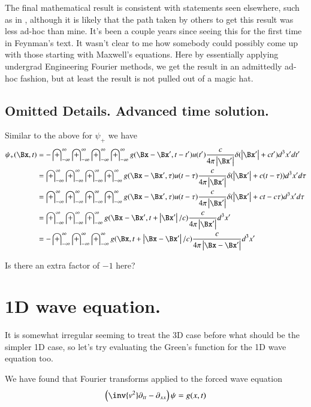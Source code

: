 \documentclass{article}
\newcommand{\IIinf}[0]{ \int_{-\infty}^\infty }
\begin{document}
The final mathematical result is consistent with statements seen elsewhere, such as in \cite{feynman1963flp}, although it is
likely that the path taken by others to get this result was less ad-hoc than mine.
It's been a couple years since seeing this for the
first time in Feynman's text.
It wasn't clear to me how somebody could possibly come up with those starting with Maxwell's equations.  
Here by essentially applying undergrad Engineering Fourier methods, we get the result in an admittedly ad-hoc fashion, but at least the result is not 
pulled out of a magic hat.

\subsection{ Omitted Details.  Advanced time solution. }

Similar to the above for $\psi_{+}$ we have
\begin{align*}
{\psi}_{+}(\Bx, t) 
&= -\IIinf \IIinf \IIinf \IIinf g(\Bx - \Bx', t - t') u(t') \frac{c }{4\pi \Abs{\Bx'}} \delta(\Abs{\Bx'} + c t') d^3 x' dt' \\
&= \IIinf \IIinf \IIinf \IIinf g(\Bx - \Bx', \tau) u(t -\tau) \frac{c }{4\pi \Abs{\Bx'}} \delta(\Abs{\Bx'} + c (t -\tau)) d^3 x' d\tau \\
&= \IIinf \IIinf \IIinf \IIinf g(\Bx - \Bx', \tau) u(t -\tau) \frac{c }{4\pi \Abs{\Bx'}} \delta(\Abs{\Bx'} + c t -c\tau) d^3 x' d\tau \\
&= \IIinf \IIinf \IIinf g(\Bx - \Bx', t + \Abs{\Bx'}/c) \frac{c }{4\pi \Abs{\Bx'}} d^3 x' \\
&= -\IIinf \IIinf \IIinf g(\Bx, t + \Abs{\Bx -\Bx'}/c) \frac{c }{4\pi \Abs{\Bx -\Bx'}} d^3 x' \\
\end{align*}

Is there an extra factor of $-1$ here?

\section{ 1D wave equation. }

It is somewhat irregular seeming to treat the 3D case before what should be the simpler 1D case, so let's 
try evaluating the Green's function for the 1D wave equation too.

We have found that Fourier transforms applied to the forced wave equation 
\begin{align}
\left( \inv{v^2} \partial_{tt} -\partial_{xx} \right)\psi = g(x,t)
\end{align}
\end{document}
